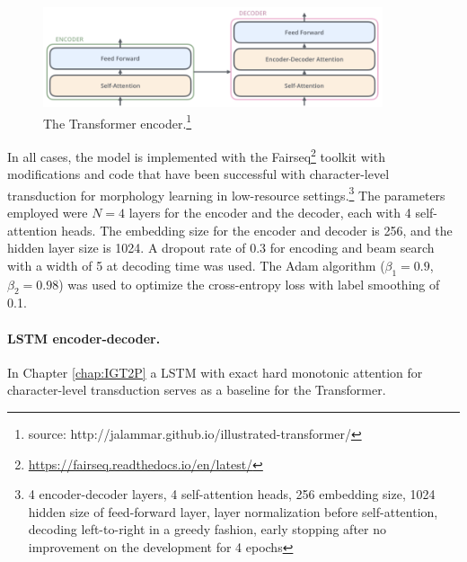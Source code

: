 \begin{figure}[t]
    \centering
    \includegraphics[width=10cm]{figs/Transformer_simplified.png}
    \caption[Transformer]{The Transformer encoder.\footnote{source: http://jalammar.github.io/illustrated-transformer/}}
    \label{fig:transformer}
\end{figure}

In all cases, the model is implemented with the Fairseq\footnote{\url{https://fairseq.readthedocs.io/en/latest/}} toolkit \citep{ott2019fairseq} with modifications and code \citep{wu2020applying} that have been successful with character-level transduction for morphology learning in low-resource settings.\footnote{4 encoder-decoder layers, 4 self-attention heads, 256 embedding size, 1024 hidden size of feed-forward layer, layer normalization before self-attention, decoding left-to-right in a greedy fashion, early stopping after no improvement on the development for 4 epochs} 
The parameters employed were $N=4$ layers for the encoder and the decoder, each with 4 self-attention heads. The embedding size for the encoder and decoder is 256, and the hidden layer size is 1024. A dropout rate of 0.3 for encoding and beam search with a width of 5 at decoding time was used. The Adam algorithm \citep{kingma2014adam} ($\beta_1 = 0.9$, $\beta_2 = 0.98$) was used to optimize the cross-entropy loss with label smoothing \citep{szegedy2016rethinking} of 0.1. 


\paragraph{LSTM encoder-decoder.} In Chapter \ref{chap:IGT2P} a LSTM with exact hard monotonic attention for character-level transduction \citep{wu-cotterell-2019-exact} serves as a baseline for the Transformer.